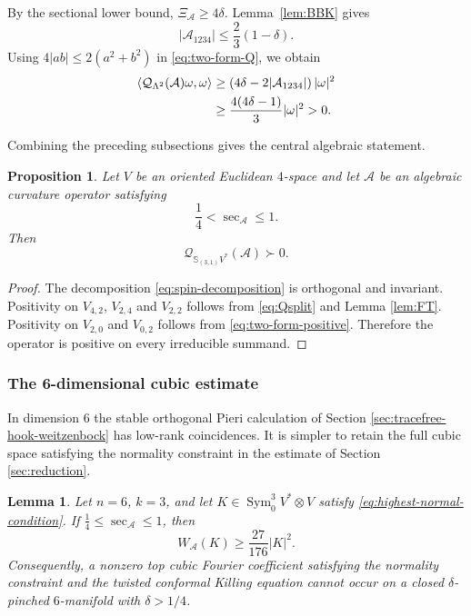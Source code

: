 \documentclass[reqno,11pt]{amsart}
\newtheorem{proposition}[theorem]{Proposition}
\newtheorem{lemma}[theorem]{Lemma}
\theoremstyle{definition}
\newcommand{\cA}{\mathcal A}
\newcommand{\cQ}{\mathcal Q}
\newcommand{\Sym}{\operatorname{Sym}}
\newcommand{\Hook}{\mathbb S_{(3,1)}}
\newcommand{\inner}[2]{\left\langle #1,#2\right\rangle}
\begin{document}
By the sectional lower bound, $\Xi_{\cA}\geq4\delta$.  Lemma~\ref{lem:BBK}
gives
$$
  |\cA_{1234}|\leq\frac23(1-\delta).
$$
Using $4|ab|\leq2(a^2+b^2)$ in \eqref{eq:two-form-Q}, we obtain
\begin{align}
  \inner{\cQ_{\Lambda^2}(\cA)\omega}{\omega}
  &\geq
  \left(4\delta-2|\cA_{1234}|\right)|\omega|^2\notag\\
  &\geq
  \frac{4(4\delta-1)}3|\omega|^2>0.
  \label{eq:two-form-positive}
\end{align}

Combining the preceding subsections gives the central algebraic statement.

\begin{proposition}
\label{prop:curvature-positive}
Let $V$ be an oriented Euclidean $4$-space and let $\cA$ be an algebraic
curvature operator satisfying
$$
  \frac14<\sec_{\cA}\leq1.
$$
Then
$$
  \cQ_{\Hook V^*}(\cA)\succ0.
$$
\end{proposition}

\begin{proof}
The decomposition \eqref{eq:spin-decomposition} is orthogonal and invariant.
Positivity on $V_{4,2}$, $V_{2,4}$ and $V_{2,2}$ follows from
\eqref{eq:Qsplit} and Lemma \ref{lem:FT}. Positivity on $V_{2,0}$ and $V_{0,2}$
follows from \eqref{eq:two-form-positive}. Therefore the operator is positive
on every irreducible summand.
\end{proof}

\subsubsection{The 6-dimensional cubic estimate}\label{sec:six-dimensional}

In dimension $6$ the stable orthogonal Pieri calculation of
Section \ref{sec:tracefree-hook-weitzenbock} has low-rank coincidences.  It is simpler to retain
the full cubic space satisfying the normality constraint in the estimate of
Section \ref{sec:reduction}.

\begin{lemma}\label{lem:six-dimensional-cubic}
Let $n=6$, $k=3$, and let
$K\in\Sym^3_0V^*\otimes V$ satisfy
\eqref{eq:highest-normal-condition}. If
$\frac14\leq\sec_{\cA}\leq1$, then
\begin{equation}\label{eq:six-dimensional-gap}
  W_{\cA}(K)\geq\frac{27}{176}|K|^2.
\end{equation}
Consequently, a nonzero top cubic Fourier coefficient satisfying the
normality constraint and the twisted conformal Killing equation cannot occur on a closed $\delta$-pinched $6$-manifold with
$\delta>1/4$.
\end{lemma}
\end{document}
